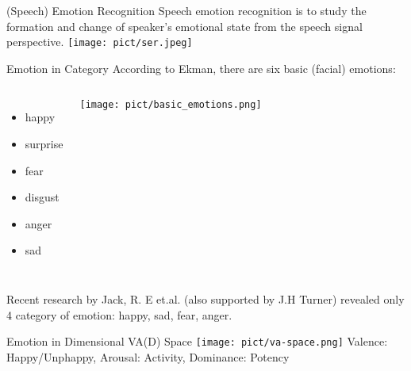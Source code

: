 \documentclass{beamer}
\begin{document}
\begin{frame}[t, fragile]{(Speech) Emotion Recognition}
Speech emotion recognition is to study the formation and change of speaker’s emotional state from the speech signal perspective.
\texttt{[image: pict/ser.jpeg]}
\end{frame}

\begin{frame}[t, fragile]{Emotion in Category}
According to Ekman\footnotemark, there are six basic (facial) emotions:
\begin{columns}
\begin{itemize}
\item happy
\item surprise
\item fear
\item disgust
\item anger
\item sad
\end{itemize}
\texttt{[image: pict/basic\_emotions.png]}
\end{columns}
Recent research by Jack, R\footnotemark. E et.al. (also supported by J.H Turner) revealed 
only 4 category of emotion: happy, sad, fear, anger.
\end{frame}

\begin{frame}[t, fragile]{Emotion in Dimensional VA(D) Space}
\texttt{[image: pict/va-space.png]}
\newline
Valence: Happy/Unphappy, Arousal: Activity, Dominance: Potency
\end{frame}

\end{document}
